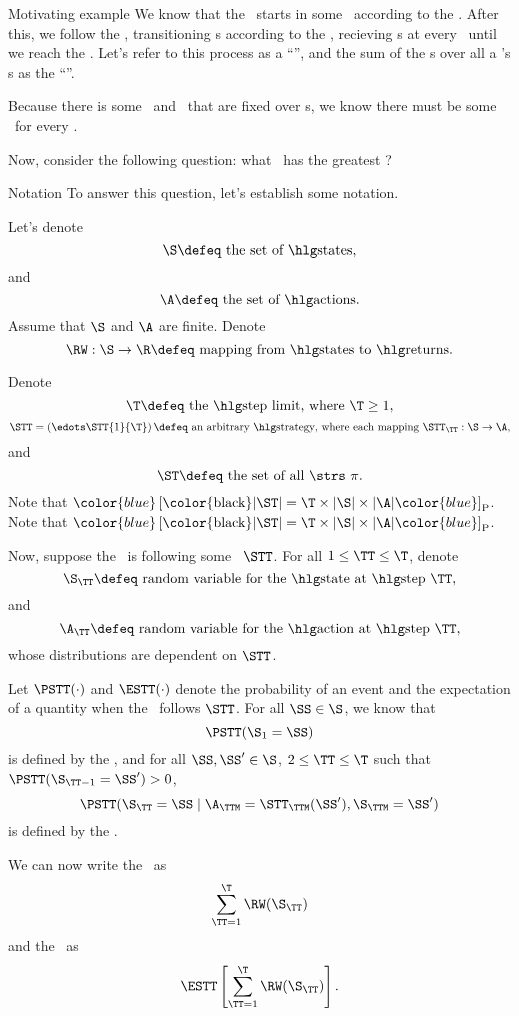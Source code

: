 \documentclass{rl_theory}
\def\lnp#1#2{$\color{blue}\left[\text{\color{black}#2}\color{blue}\right]_{\rm P}$}
\begin{document}
\begin{part} {Motivating example}
  We know that the \agt\ starts in some \til\ according to the \ind.
  After this, we follow the \str, 
  transitioning \til{}s according to the \trd, recieving \rwd{}s 
  at every \til\ until
  we reach the \lmt. Let's refer to this process as a ``\run'', and
  the sum of the \rwd{}s over all a \run's \til{}s
  as the ``\trwd''.

  Because there is some \ind\ and \trd\ 
  that are fixed over \run{}s, 
  we know there must be 
  some \atrwd\ for every \str.

  Now, consider the following question: 
  what \str\ has the greatest \atrwd?
\end{part}

\newpage
\begin{part}{Notation}
  To answer this question, let's establish some notation.

  Let's denote
  $$\text{$\S \defeq$ the set of \til{}s},$$
  and 
  $$\text{$\A \defeq$ the set of \act{}s.}$$
  Assume that $\S$ and $\A$ are finite.
  Denote
  $$\text{$\RW : \S \rightarrow \R \defeq$ mapping from \til{}s to \rwd{}s.}$$

  Denote
  $$\text{$\T \defeq$ the \lmt, where $\T \ge 1$},$$
  $$\text{$\STT = \left(\edots\STT{1}{\T}\right) \defeq$ an arbitrary \str, 
  where each mapping $\STT_\TT : \S \rightarrow \A$},$$
  and
  $$\text{$\ST \defeq$ the set of all \strs\ $\pi$}.$$
  Note that \lnp{asdf1}{$|\ST| = \T \times |\S| \times |\A|$}.  Note that \lnp{asdf2}{$|\ST| = \T \times |\S| \times |\A|$}.

  Now, suppose the \agt\ is following some \str\ $\STT$.
  For all $1 \le \TT \le \T$,
  denote
  $$\text{$\S_\TT \defeq$ random variable for the \til\ at \stp\ $\TT$},$$
  and
  $$\text{$\A_\TT \defeq$ random variable for the \act\ at \stp\ $\TT$},$$
  whose distributions are dependent on $\STT$.

  Let $\PSTT(\cdot)$ and $\ESTT(\cdot)$ denote the probability of an event
  and the expectation of a quantity
  when the \agt\ follows $\STT$.
  For all $\SS \in \S$, we know that
  $$\PSTT(\S_1 = \SS)$$
  is defined by the \ind, and
  for all $\SS, \SS' \in \S$, $2 \le \TT \le \T$ such that 
  $\PSTT(\S_{\TT - 1} = \SS') > 0$,
  $$\PSTT(\S_\TT = \SS \mid \A_\TTM = \STT_\TTM(\SS'), \S_\TTM = \SS')$$
  is defined by the \trd.

  We can now write the \trwd\ as
  $$\sum_{\TT = 1}^\T \RW(\S_\TT)$$
  and the \atrwd\ as
  $$\ESTT\left[\sum_{\TT = 1}^\T \RW(\S_\TT)\right].$$
\end{part}
\end{document}
